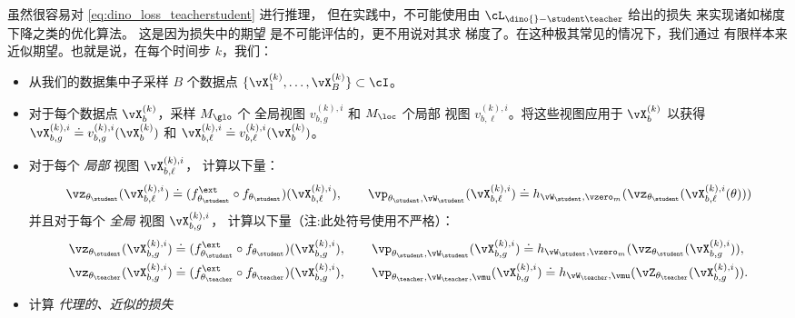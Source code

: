 \documentclass[../../book-main_zh.tex]{subfiles}
\begin{document}
虽然很容易对 \eqref{eq:dino_loss_teacherstudent} 进行推理，
但在实践中，不可能使用由 \(\cL_{\dino{}-\student\teacher}\) 给出的损失
来实现诸如梯度下降之类的优化算法。
这是因为损失中的期望
是不可能评估的，更不用说对其求
梯度了。在这种极其常见的情况下，我们通过
有限样本来近似期望。也就是说，在每个时间步 \(k\)，我们：
\begin{itemize}
    \item 从我们的数据集中子采样 \(B\) 个数据点
        \(\{\vX_{1}^{(k)}, \dots, \vX_{B}^{(k)}\} \subset \cI\)。
    \item 对于每个数据点 \(\vX_{b}^{(k)}\)，采样 \(M_{\glo}\) 个
        全局视图 \(v_{b, g}^{(k), i}\) 和 \(M_{\loc}\) 个局部
        视图 \(v_{b, \ell}^{(k), i}\)。将这些视图应用于
        \(\vX_{b}^{(k)}\) 以获得 \(\vX_{b, g}^{(k), i} \doteq
        v_{b, g}^{(k), i}(\vX_{b}^{(k)})\) 和 \(\vX_{b, \ell}^{(k),
        i} \doteq v_{b, \ell}^{(k), i}(\vX_{b}^{(k)})\)。
    \item 对于每个 \textit{局部} 视图 \(\vX_{b, \ell}^{(k), i}\)，
        计算以下量：
        \begin{equation}
            \vz_{\theta_{\student}}(\vX_{b, \ell}^{(k), i}) \doteq
            (f_{\theta_{\student}}^{\ext} \circ
            f_{\theta_{\student}})(\vX_{b, \ell}^{(k), i}), \qquad
            \vp_{\theta_{\student}, \vW_{\student}}(\vX_{b,
            \ell}^{(k), i}) \doteq h_{\vW_{\student},
            \vzero_{m}}(\vz_{\theta_{\student}}(\vX_{b, \ell}^{(k), i}(\theta)))
        \end{equation}
        并且对于每个 \textit{全局} 视图 \(\vX_{b, g}^{(k), i}\)，
        计算以下量（注:此处符号使用不严格）：
        \begin{align}
            &\vz_{\theta_{\student}}(\vX_{b, g}^{(k), i}) \doteq
            (f_{\theta_{\student}}^{\ext} \circ
            f_{\theta_{\student}})(\vX_{b, g}^{(k), i}), \qquad
            \vp_{\theta_{\student}, \vW_{\student}}(\vX_{b, g}^{(k),
            i}) \doteq h_{\vW_{\student},
            \vzero_{m}}(\vz_{\theta_{\student}}(\vX_{b, g}^{(k), i})), \\
            &\vz_{\theta_{\teacher}}(\vX_{b, g}^{(k), i}) \doteq
            (f_{\theta_{\teacher}}^{\ext} \circ
            f_{\theta_{\teacher}})(\vX_{b, g}^{(k), i}), \qquad
            \vp_{\theta_{\teacher}, \vW_{\teacher}, \vmu}(\vX_{b,
            g}^{(k), i}) \doteq h_{\vW_{\teacher},
            \vmu}(\vZ_{\theta_{\teacher}}(\vX_{b, g}^{(k), i})).
        \end{align}
    \item 计算 \textit{代理的、近似的损失}

\end{itemize}
\end{document}
